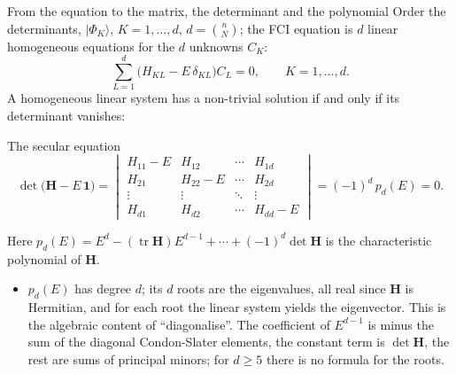\documentclass[aspectratio=169,10pt]{beamer}
\newcommand{\ket}[1]{\vert #1\rangle}
\DeclareMathOperator{\tr}{tr}
\begin{document}
\begin{frame}{From the equation to the matrix, the determinant and the polynomial}
  \footnotesize
  Order the determinants, $\ket{\Phi_K}$, $K=1,\dots,d$, $d=\binom{n}{N}$; the FCI equation is $d$ linear homogeneous equations for the $d$ unknowns $C_K$:
  \[
    \sum_{L=1}^{d}\bigl(H_{KL}-E\,\delta_{KL}\bigr)C_L=0,\qquad K=1,\dots,d .
  \]
  A homogeneous linear system has a non-trivial solution if and only if its determinant vanishes:
  \begin{block}{The secular equation}
    \[
      \det\bigl(\bm{H}-E\,\bm{1}\bigr)=
      \begin{vmatrix}
        H_{11}-E & H_{12} & \cdots & H_{1d}\\
        H_{21} & H_{22}-E & \cdots & H_{2d}\\
        \vdots & \vdots & \ddots & \vdots\\
        H_{d1} & H_{d2} & \cdots & H_{dd}-E
      \end{vmatrix}
      =(-1)^d\,p_d(E)=0 .
    \]
  \end{block}
  \vspace{-0.4em}
  Here $p_d(E)=E^d-(\tr\bm{H})E^{d-1}+\cdots+(-1)^d\det\bm{H}$ is the \alert{characteristic polynomial} of $\bm{H}$.
  \begin{itemize}
    \item $p_d(E)$ has degree $d$; its $d$ roots are the eigenvalues, all real since $\bm{H}$ is Hermitian, and for each root the linear system yields the eigenvector. This is the algebraic content of ``diagonalise''. The coefficient of $E^{d-1}$ is minus the sum of the diagonal Condon-Slater elements, the constant term is $\det\bm{H}$, the rest are sums of principal minors; for $d\ge5$ there is no formula for the roots.
  \end{itemize}
\end{frame}
\end{document}
